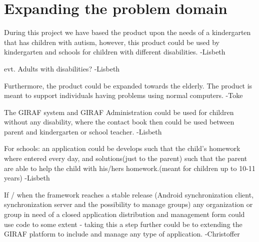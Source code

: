 \section{Expanding the problem domain}


During this project we have based the product upon the needs of a kindergarten that has children with autism, however, this product could be used by kindergarten and schools for children with different disabilities. -Lisbeth

evt. Adults with disabilities? -Lisbeth

Furthermore, the product could be expanded towards the elderly. The product is meant to support individuals having problems using normal computers. -Toke 

The GIRAF system and GIRAF Administration could be used for children without any disability, where the contact book then could be used between parent and kindergarten or school teacher. -Lisbeth

For schools: an application could be develops such that the child's homework where entered every day, and solutions(just to the parent) such that the parent are able to help the child with his/hers homework.(meant for children up to 10-11 years) -Lisbeth


If / when the framework reaches a stable release (Android synchronization client, synchronization server and the possibility to manage groups) any organization or group in need of a closed application distribution and management form could use code to some extent - taking this a step further could be to extending the GIRAF platform to include and manage any type of application. -Christoffer

    